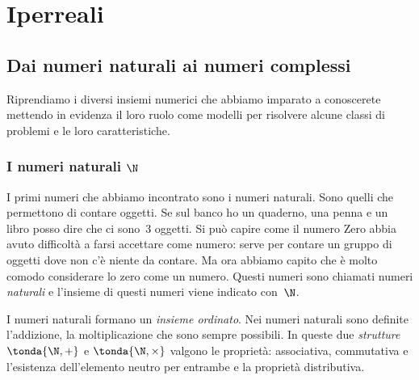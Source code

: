 



\chapter{Iperreali}

\section{Dai numeri naturali ai numeri complessi} 
\label{sec:iperreali:01_introduzione}

Riprendiamo i diversi insiemi numerici che abbiamo imparato a conoscerete 
mettendo in evidenza il loro ruolo come modelli per risolvere alcune classi di 
problemi e le loro caratteristiche.

\subsection{I numeri naturali \(\N\)} 
\label{subsec:insnum_naturali}

I primi numeri che abbiamo incontrato sono i numeri naturali. Sono quelli che 
permettono di contare oggetti. Se sul banco ho un quaderno, una penna e un libro 
posso dire che ci sono~3 oggetti. Si può capire come il numero Zero abbia avuto 
difficoltà a farsi accettare come numero: serve per contare un gruppo di oggetti 
dove non c'è niente da contare. Ma ora abbiamo capito che è molto comodo 
considerare lo zero come un numero. Questi numeri sono chiamati numeri 
\emph{naturali} e l'insieme di questi numeri viene indicato con~\(\N\).

I numeri naturali formano un \emph{insieme ordinato}.
Nei numeri naturali sono definite l'addizione, la moltiplicazione che sono 
sempre possibili. In queste due \emph{strutture} \(\tonda{\N, +}\) e 
\(\tonda{\N, \times}\) valgono le proprietà: associativa, commutativa e 
l'esistenza dell'elemento neutro per entrambe e la proprietà distributiva.

